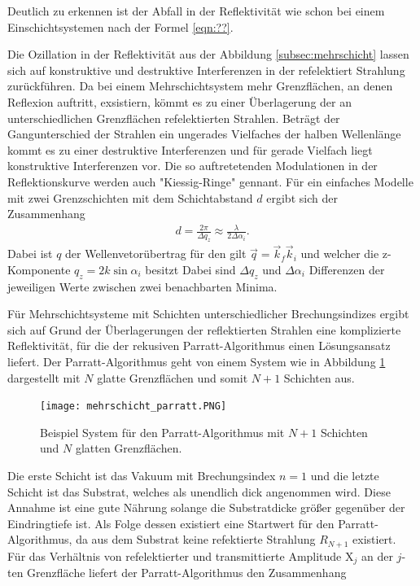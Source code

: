 Deutlich zu erkennen ist der Abfall in der Reflektivität wie schon
bei einem Einschichtsystemen nach der Formel \eqref{eqn:??}.

Die Ozillation in der Reflektivität aus der Abbildung \ref{subsec:mehrschicht}
lassen sich auf konstruktive und destruktive Interferenzen in
der refelektiert Strahlung zurückführen.
Da bei einem Mehrschichtsystem mehr
Grenzflächen, an denen Reflexion auftritt, exsistiern,
kömmt es zu einer Überlagerung der an unterschiedlichen Grenzflächen
refelektierten Strahlen.
Beträgt der Gangunterschied der Strahlen
ein ungerades Vielfaches der halben Wellenlänge
kommt es zu einer destruktive Interferenzen und für gerade Vielfach
liegt konstruktive Interferenzen vor.
Die so auftretetenden
Modulationen in der Reflektionskurve
werden auch "Kiessig-Ringe" gennant.
Für ein einfaches Modelle mit zwei
Grenzschichten mit dem Schichtabstand $d$
ergibt sich der Zusammenhang
\begin{align}
  d = \frac{2\pi}{\Delta q_z} \approx \frac{\lambda}{2\Delta \alpha_i}.
\end{align}
Dabei ist $q$ der Wellenvetorübertrag für den gilt
$\vec{q} = \vec{k}_f \vec{k}_i$ und welcher die z-Komponente $q_z=2k\sin \alpha_i$ besitzt
Dabei sind $\Delta q_z$ und $\Delta\alpha_i$ Differenzen
der jeweiligen
Werte zwischen zwei benachbarten Minima. %

Für Mehrschichtsysteme mit Schichten
unterschiedlicher Brechungsindizes
ergibt sich auf Grund der Überlagerungen der reflektierten
Strahlen eine
komplizierte Reflektivität, für die der
rekusiven Parratt-Algorithmus einen Lösungsansatz
liefert.
Der Parratt-Algorithmus geht von einem System
wie in Abbildung \ref{fig:parratt_syst} dargestellt
mit $N$ glatte Grenzflächen und somit $N+1$ Schichten
aus.

\begin{figure}
  \centering
\texttt{[image: mehrschicht\_parratt.PNG]}
\caption{Beispiel System für den Parratt-Algorithmus
mit $N+1$ Schichten und $N$ glatten Grenzflächen.\cite{sample}}
\label{fig:parratt_syst}
\end{figure}

Die erste Schicht ist das Vakuum mit Brechungsindex $n=1$
und die letzte Schicht ist das Substrat, welches als
unendlich dick angenommen wird.
Diese Annahme ist
eine gute Nährung
solange
die Substratdicke größer gegenüber der
Eindringtiefe ist.
Als Folge dessen existiert eine Startwert
für den Parratt-Algorithmus, da
aus dem Substrat keine refektierte Strahlung $R_{N+1}$
existiert.
Für das Verhältnis von refelektierter und transmittierte Amplitude
$\mathrm{X}_j$ an der $j$-ten Grenzfläche liefert der
Parratt-Algorithmus den Zusammenhang

